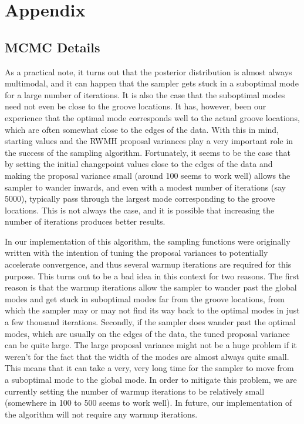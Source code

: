 \documentclass[12pt]{article}
\begin{document}
\section{Appendix}

\subsection{MCMC Details}

As a practical note, it turns out that the posterior distribution is
almost always multimodal, and it can happen that the sampler gets stuck
in a suboptimal mode for a large number of iterations. It is also the
case that the suboptimal modes need not even be close to the groove
locations. It has, however, been our experience that the optimal mode
corresponds well to the actual groove locations, which are often
somewhat close to the edges of the data. With this in mind, starting
values and the RWMH proposal variances play a very important role in the
success of the sampling algorithm. Fortunately, it seems to be the case
that by setting the initial changepoint values close to the edges of the
data and making the proposal variance small (around 100 seems to work
well) allows the sampler to wander inwards, and even with a modest
number of iterations (say 5000), typically pass through the largest mode
corresponding to the groove locations. This is not always the case, and
it is possible that increasing the number of iterations produces better
results.

In our implementation of this algorithm, the sampling functions were
originally written with the intention of tuning the proposal variances
to potentially accelerate convergence, and thus several warmup
iterations are required for this purpose. This turns out to be a bad
idea in this context for two reasons. The first reason is that the
warmup iterations allow the sampler to wander past the global modes and
get stuck in suboptimal modes far from the groove locations, from which
the sampler may or may not find its way back to the optimal modes in
just a few thousand iterations. Secondly, if the sampler does wander
past the optimal modes, which are usually on the edges of the data, the
tuned proposal variance can be quite large. The large proposal variance
might not be a huge problem if it weren't for the fact that the width of
the modes are almost always quite small. This means that it can take a
very, very long time for the sampler to move from a suboptimal mode to
the global mode. In order to mitigate this problem, we are currently
setting the number of warmup iterations to be relatively small
(somewhere in 100 to 500 seems to work well). In future, our
implementation of the algorithm will not require any warmup iterations.
\end{document}
